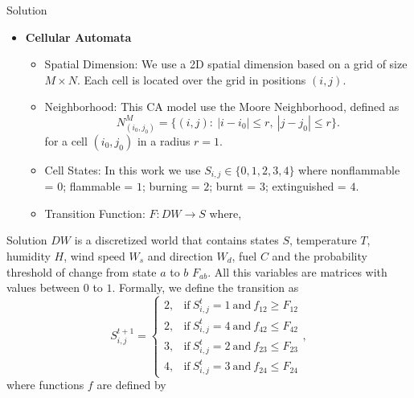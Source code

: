 \documentclass{beamer}
\begin{document}
        \begin{frame}{Solution}
            \begin{itemize}
                \item<1-> \textbf{Cellular Automata}
                    \begin{itemize}
                        \item<2-> Spatial Dimension: We use a 2D spatial dimension based on a grid of size $M\times N$.
                            Each cell is located over the grid in positions $(i,j)$.
                        \item<3-> Neighborhood: This CA model use the Moore Neighborhood, defined as
                            \begin{equation}
                                N_{(i_0,j_0)}^M = \{(i,j): ~ |i-i_0|\leq r, ~ |j-j_0|\leq r \}.
                            \end{equation}
                            for a cell $(i_0, j_0)$ in a radius $r=1$.
                        \item<4-> Cell States: In this work we use $S_{i,j}\in \{0, 1, 2, 3, 4\}$ where nonflammable = $0$; 
                            flammable = $1$; burning = $2$; burnt = $3$; extinguished = $4$.
                        \item<5-> Transition Function: $F: DW \rightarrow S$ where,
                    \end{itemize}
            \end{itemize}
        \end{frame}
        
        \begin{frame}{Solution}
            $DW$ is a discretized world that contains states $S$, temperature $T$, humidity $H$, wind speed $W_s$ and direction $W_d$, 
            fuel $C$ and the probability threshold of change from state $a$ to $b$ $F_{ab}$. All this variables are matrices with
            values between $0$ to $1$. Formally, we define the transition as
            \begin{equation}
                S_{i,j}^{t+1} =
                \begin{cases}
                    2, & \text{if} ~ S_{i,j}^{t} = 1 ~ \text{and} ~ f_{12} \geq F_{12} \\
                    2, & \text{if} ~ S_{i,j}^{t} = 4 ~ \text{and} ~ f_{42} \leq F_{42} \\
                    3, & \text{if} ~ S_{i,j}^{t} = 2 ~ \text{and} ~ f_{23} \leq F_{23} \\
                    4, & \text{if} ~ S_{i,j}^{t} = 3 ~ \text{and} ~ f_{24} \leq F_{24}
                \end{cases},
            \end{equation}
            where functions $f$ are defined by
        \end{frame}
        
\end{document}
